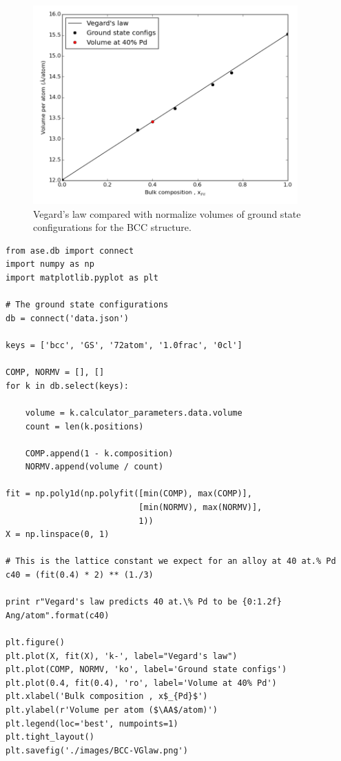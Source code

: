 \documentclass[number, sort&compress, review, 12pt]{elsarticle}
\begin{document}
\begin{figure}[H]
\centering
\includegraphics[width=4in]{./images/BCC-VGlaw.png}
\caption{\label{fig-vgd}Vegard's law compared with normalize volumes of ground state configurations for the BCC structure.}
\end{figure}

\begin{verbatim}
from ase.db import connect
import numpy as np
import matplotlib.pyplot as plt

# The ground state configurations
db = connect('data.json')

keys = ['bcc', 'GS', '72atom', '1.0frac', '0cl']

COMP, NORMV = [], []
for k in db.select(keys):

    volume = k.calculator_parameters.data.volume
    count = len(k.positions)

    COMP.append(1 - k.composition)
    NORMV.append(volume / count)

fit = np.poly1d(np.polyfit([min(COMP), max(COMP)],
                           [min(NORMV), max(NORMV)],
                           1))
X = np.linspace(0, 1)

# This is the lattice constant we expect for an alloy at 40 at.% Pd
c40 = (fit(0.4) * 2) ** (1./3)

print r"Vegard's law predicts 40 at.\% Pd to be {0:1.2f} Ang/atom".format(c40)

plt.figure()
plt.plot(X, fit(X), 'k-', label="Vegard's law")
plt.plot(COMP, NORMV, 'ko', label='Ground state configs')
plt.plot(0.4, fit(0.4), 'ro', label='Volume at 40% Pd')
plt.xlabel('Bulk composition , x$_{Pd}$')
plt.ylabel(r'Volume per atom ($\AA$/atom)')
plt.legend(loc='best', numpoints=1)
plt.tight_layout()
plt.savefig('./images/BCC-VGlaw.png')
\end{verbatim}
\end{document}
